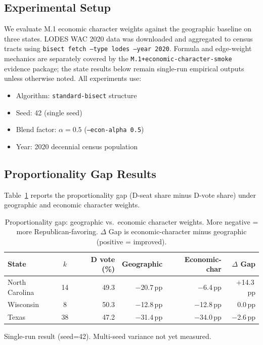 \label{sec:results}

\subsection{Experimental Setup}

We evaluate M.1 economic character weights against the geographic baseline
on three states.
LODES WAC 2020 data was downloaded and aggregated to census tracts using
\texttt{bisect fetch --type lodes --year 2020}.
Formula and edge-weight mechanics are separately covered by the
\texttt{M.1+economic-character-smoke} evidence package; the state results below
remain single-run empirical outputs unless otherwise noted.
All experiments use:
\begin{itemize}
  \item Algorithm: \texttt{standard-bisect} structure
  \item Seed: 42 (single seed)
  \item Blend factor: $\alpha = 0.5$ (\texttt{--econ-alpha 0.5})
  \item Year: 2020 decennial census population
\end{itemize}

\subsection{Proportionality Gap Results}

Table~\ref{tab:main-results} reports the proportionality gap (D-seat share
minus D-vote share) under geographic and economic character weights.

\begin{table}[ht]
\centering
\begin{threeparttable}
\caption{Proportionality gap: geographic vs.\ economic character weights.
  More negative = more Republican-favoring.
  $\Delta$ Gap is economic-character minus geographic (positive = improved).}
\label{tab:main-results}
\begin{tabular}{lcrrrr}
  \toprule
  State & $k$ & D vote (\%) & Geographic & Economic-char & $\Delta$ Gap \\
  \midrule
  North Carolina & 14 & 49.3 & $-$20.7\,pp & $-$6.4\,pp & $+$14.3\,pp \\
  Wisconsin\tnote{$\dagger$}      &  8 & 50.3 & $-$12.8\,pp & $-$12.8\,pp & 0.0\,pp \\
  Texas\tnote{$\dagger$}          & 38 & 47.2 & $-$31.4\,pp & $-$34.0\,pp & $-$2.6\,pp \\
  \bottomrule
\end{tabular}
\begin{tablenotes}
  \small
  \item[$\dagger$] Single-run result (seed=42). Multi-seed variance not yet measured.
\end{tablenotes}
\end{threeparttable}
\end{table}

